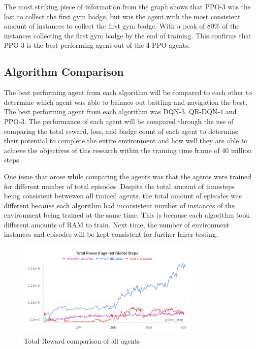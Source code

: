 The most striking piece of information from the graph shows that PPO-3 was the last to collect the first gym badge, but was the agent with the most consistent amount of instances to collect the first gym badge. With a peak of 80\% of the instances collecting the first gym badge by the end of training. This confirms that PPO-3 is the best performing agent out of the 4 PPO agents.

\subsection{Algorithm Comparison}

The best performing agent from each algorithm will be compared to each other to determine which agent was able to balance out battling and navigation the best. The best performing agent from each algorithm was DQN-3, QR-DQN-4 and PPO-3. The performance of each agent will be compared through the use of comparing the total reward, loss, and badge count of each agent to determine their potential to complete the entire environment and how well they are able to achieve the objectives of this research within the training time frame of 40 million steps. 

One issue that arose while comparing the agents was that the agents were trained for different number of total episodes. Despite the total amount of timesteps being consistent betwewen all trained agents, the total amount of episodes was different because each algorithm had inconsistent number of instances of the environment being trained at the same time. This is because each algorithm took different amounts of RAM to train. Next time, the number of environment instances and episodes will be kept consistent for further fairer testing. 

\begin{figure}[H]
    \centering
    \includegraphics[width=0.8\textwidth]{figures/3_Total_Reward.png}
    \caption{Total Reward comparison of all agents}
    \label{fig:agent_eval_all_reward}
\end{figure}

